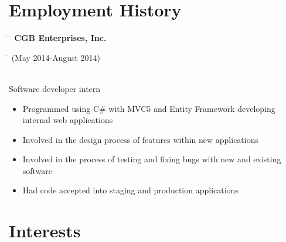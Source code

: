 \documentclass[10pt]{article} %
\begin{document}

\section{Employment History}
\vspace{-6mm}

\parbox{0.5\textwidth}{ %
\begin{tabbing} %
\hspace{2cm} \= \hspace{3cm} \= \kill %
\textbf{CGB Enterprises, Inc.}
\end{tabbing}}
\hfill %
\parbox{0.5\textwidth}{ %
\begin{tabbing} %
\hspace{5cm} \= \kill %
(May 2014-August 2014)
\end{tabbing}}
\vspace{-3mm}
\\Software developer intern
\vspace{-2mm}
\begin{itemize}
\item Programmed using C\# with MVC5 and Entity Framework developing internal web applications
\vspace{-3mm}
\item Involved in the design process of features within new applications
\vspace{-3mm}
\item Involved in the process of testing and fixing bugs with new and existing software
\vspace{-3mm}
\item Had code accepted into staging and production applications
\vspace{-3mm}
\end{itemize}


\section{Interests}
\vspace{-3mm}

\end{document}
